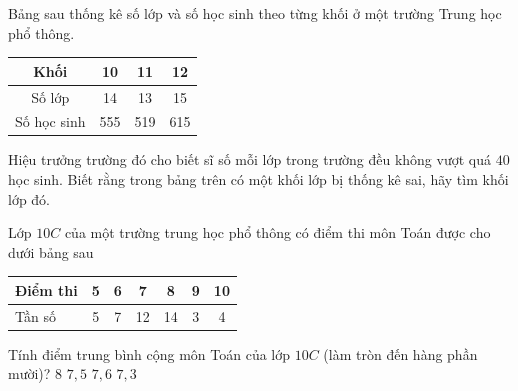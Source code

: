 \begin{bt}%
    Bảng sau thống kê số lớp và số học sinh theo từng khối ở một trường Trung học phổ thông.
    \begin{center}
        \begin{tabular}{|c|c|c|c|}
            \hline Khối & 10 & 11 & 12 \\
            \hline Số lớp & 14 & 13 & 15 \\
            \hline Số học sinh & 555 & 519 & 615 \\
            \hline
        \end{tabular}
    \end{center}
    Hiệu trưởng trường đó cho biết sĩ số mỗi lớp trong trường đều không vượt quá $40$ học sinh. Biết rằng trong bảng trên có một khối lớp bị thống kê sai, hãy tìm khối lớp đó.
\end{bt}

\begin{ex}%
	Lớp $ 10C $ của một trường trung học phổ thông có điểm thi môn Toán được cho dưới bảng sau 
	\begin{center}
		\begin{tabular}{|l|c|c|c|c|c|c|}
			\hline Điểm thi & 5 &  6 & 7 & 8 & 9 & 10 \\
			 \hline Tần số & 5 & 7 & 12 & 14 & 3 & 4 \\
			\hline 
		\end{tabular}
	\end{center}
	Tính điểm trung  bình cộng môn Toán của lớp $10C$ (làm tròn đến hàng phần mười)?
	 \choice
		{$  8 $}
		{$ 7{,}5 $  }
		 {$ 7{,}6 $}
		{\True  $ 7{,}3 $}
\end{ex}
